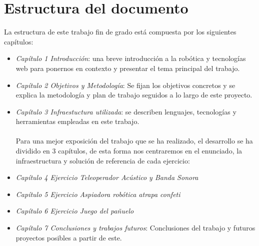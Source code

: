 \newpage
\section{Estructura del documento}

La estructura de este trabajo fin de grado está compuesta por los siguientes capítulos:

\begin{itemize}
    \item \textit{Capítulo 1 Introducción}: una breve introducción a la robótica y tecnologías web para ponernos en contexto y presentar el tema principal del trabajo.
    \item \textit{Capítulo 2 Objetivos y Metodología}: Se fijan los objetivos concretos y se explica la metodología y plan de trabajo seguidos a lo largo de este proyecto.
    \item \textit{Capítulo 3 Infraestuctura utilizada}: se describen lenguajes, tecnologías y herramientas empleadas en este trabajo.
    \\
    \\
    Para una mejor exposición del trabajo que se ha realizado, el desarrollo se ha dividido en 3 capítulos, de esta forma nos centraremos en el enunciado, la infraestructura y solución de referencia de cada ejercicio:
    

   \item \textit{Capítulo 4 Ejercicio Teleoperador Acústico y Banda Sonora}
    \item \textit{Capítulo 5 Ejercicio Aspiadora robótica atrapa confeti}
    
    \item \textit{Capítulo 6 Ejercicio Juego del pañuelo}

    
    \item \textit{Capítulo 7 Conclusiones y trabajos futuros}: Conclusiones del trabajo y futuros proyectos posibles a partir de este.
  
   \end{itemize}